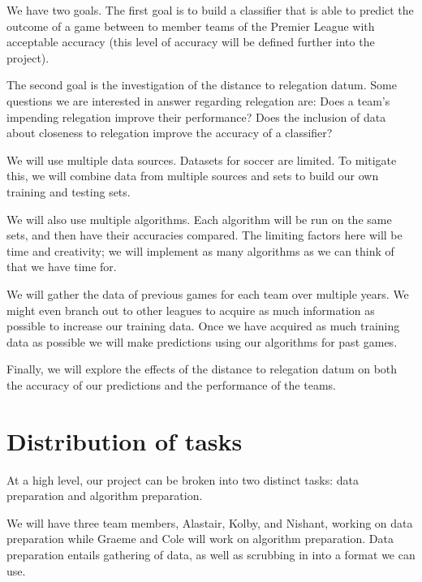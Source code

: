 \documentclass[conference]{IEEEtran}
\begin{document}
We have two goals. The first goal is to build a classifier that is  able to predict the outcome of a game between to member teams of the Premier League with acceptable accuracy (this level of accuracy will be defined further into the project).

The second goal is the investigation of the distance to relegation datum. Some questions we are interested in answer regarding relegation are:
Does a team’s impending relegation improve their performance?
Does the inclusion of data about closeness to relegation improve the accuracy of a classifier?

We will use multiple data sources. Datasets for soccer are limited. To mitigate this, we will combine data from multiple sources and sets to build our own training and testing sets.

We will also use multiple algorithms. Each algorithm will be run on the same sets, and then have their accuracies compared.  The limiting factors here will be time and creativity; we will implement as many algorithms as we can think of that we have time for.

We will gather the data of previous games for each team over multiple years. We might even branch out to other leagues to acquire as much information as possible to increase our training data. Once we have acquired as much training data as possible we will make predictions using our algorithms for past games.

Finally, we will explore the effects of the distance to relegation datum on both the accuracy of our predictions and the performance of the teams.
\section{Distribution of tasks}
At a high level, our project can be broken into two distinct tasks: data preparation and algorithm preparation.

We will have three team members, Alastair, Kolby, and Nishant, working on data preparation while Graeme and Cole will work on algorithm preparation.
Data preparation entails gathering of data, as well as scrubbing in into a format we can use.
\end{document}
